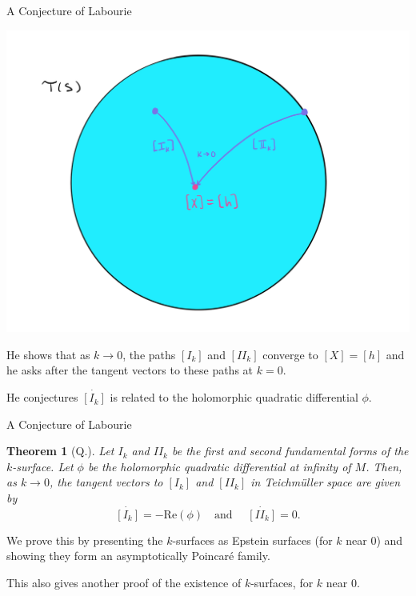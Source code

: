 \documentclass[professionalfont]{beamer}
\newtheorem{thm}{Theorem}[section]
\newcommand{\two}{I\!I}
\begin{document}


\begin{frame}{A Conjecture of Labourie}

\vspace{-0.5cm}
\begin{center}
\includegraphics[scale=0.07]{Teich-paths.jpg}
\end{center}

\vspace{-0.5cm}
He shows that as $k \to 0$, the paths $[I_k]$ and $[\two_k]$ converge to $[X] = [h]$ and he asks after the tangent vectors to these paths at $k=0$. 
\newline

He conjectures $\dot{[I_k]}$ is related to the holomorphic quadratic differential $\phi$.
\end{frame}


\begin{frame}{A Conjecture of Labourie}
 
\begin{thm}[Q.] \label{labourie-conjecture-proof}
Let $I_k$ and $\two_k$ be the first and second fundamental forms of the $k$-surface. 
Let $\phi$ be the holomorphic quadratic differential at infinity of $M$. 
Then, as $k \to 0$, the tangent vectors to $[I_k]$ and $[\two_k]$ in Teichm\"uller space are given by 
\[
\dot{[I_k]} = - \mathrm{Re}(\phi) \quad \text{and } \quad   \dot{[\two_k]} = 0.
\]
\end{thm} \pause

\vspace{0.5cm}

We prove this by presenting the $k$-surfaces as Epstein surfaces (for $k$ near 0) and showing they form an asymptotically Poincar\'e family.
\newline

This also gives another proof of the existence of $k$-surfaces, for $k$ near 0.

\end{frame}
\end{document}
